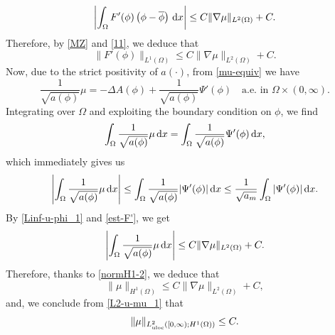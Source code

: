 \documentclass[11pt,reqno]{amsart}
\theoremstyle{remark}
\def\d{{\rm d}}
\numberwithin{equation}{section}
\def\d{{\rm d}}
\begin{document}
\begin{equation}
\label{11}
\left| \int_{\Omega} F'(\phi) \left( \phi-\overline{\phi} \right) \, \d x \right|
\leq C \| \nabla \mu\|_{L^2(\Omega)} + C.
\end{equation}
Therefore, by \eqref{MZ} and \eqref{11}, we deduce that
\begin{equation}
\label{est-F'}
\| F'(\phi)\|_{L^1(\Omega)} \leq C  \| \nabla \mu\|_{L^2(\Omega)} + C.
\end{equation}
Now, due to the strict positivity of $a(\cdot)$, from \eqref{mu-equiv} we have
$$
\frac{1}{\sqrt{a(\phi)}} \mu = - \Delta A(\phi) + \frac{1}{\sqrt{a(\phi)}} \Psi'(\phi) \quad \text{a.e. in } \Omega \times (0,\infty).
$$
Integrating over $\Omega$ and exploiting the boundary condition on $\phi$, we find
\begin{equation*}
\int_\Omega \frac{1}{\sqrt{a(\phi)}} \mu \, \d x =
\int_\Omega \frac{1}{\sqrt{a(\phi)}} \Psi'(\phi) \, \d x,
\end{equation*}
which immediately gives us
$$
\left| \int_\Omega \frac{1}{\sqrt{a(\phi)}} \mu \, \d x \right|
\leq \int_\Omega \frac{1}{\sqrt{a(\phi)}} |\Psi'(\phi)| \, \d x
\leq \frac{1}{\sqrt{a_m}} \int_\Omega |\Psi'(\phi)| \, \d x.
$$
By \eqref{Linf-u-phi_1} and \eqref{est-F'}, we get
$$
\left| \int_\Omega \frac{1}{\sqrt{a(\phi)}} \mu \, \d x \right| \leq C \| \nabla \mu\|_{L^2(\Omega)} + C.
$$
Therefore, thanks to \eqref{normH1-2}, we deduce that
\begin{equation}
\label{est-mu-H1}
\| \mu\|_{H^1(\Omega)}\leq C \| \nabla \mu\|_{L^2(\Omega)} + C,
\end{equation}
and, we conclude from \eqref{L2-u-mu_1} that
\begin{equation}
\label{mu-H1}
\| \mu \|_{L^2_{\rm uloc}([0,\infty); H^1(\Omega))}\leq C.
\end{equation}
\smallskip
\end{document}

